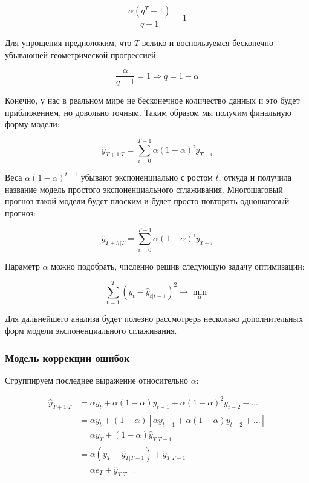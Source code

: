 \documentclass[12pt,fleqn]{article}
\begin{document}
\begin{equation}
\frac{\alpha(q^T - 1)}{q-1} = 1
\end{equation}

Для упрощения предположим, что $T$ велико и воспользуемся бесконечно убывающей геометрической прогрессией:

\begin{equation}
\frac{\alpha}{q-1} = 1 \Rightarrow q = 1-\alpha
\end{equation}

Конечно, у нас в реальном мире не бесконечное количество данных и это будет приближением, но довольно точным. Таким образом мы получим финальную форму модели:

\begin{equation}
\hat{y}_{T+1|T} = \sum_{i=0}^{T-1} \alpha (1-\alpha)^{i} y_{T-i}
\end{equation}

Веса $ \alpha (1-\alpha)^{t-1} $ убывают экспоненциально с ростом $t$, откуда и получила название модель простого экспоненциального сглаживания. Многошаговый прогноз такой модели будет плоским и будет просто повторять одношаговый прогноз:

\begin{equation}
\hat{y}_{T+h|T} = \sum_{i=0}^{T-1} \alpha (1-\alpha)^{i} y_{T-i}
\end{equation}

Параметр $\alpha$ можно подобрать, численно решив следующую задачу оптимизации:

$$
\sum_{t=1}^{T}(y_t - \hat{y}_{t|t-1})^2 \rightarrow \min_\alpha
$$

Для дальнейшего анализа будет полезно рассмотрерь несколько дополнительных форм модели экспоненциального сглаживания.

\subsubsection{Модель коррекции ошибок}

Сгруппируем последнее выражение относительно $\alpha$:

\begin{equation}
	\label{error_correction}
	\begin{split}
		\hat{y}_{T+1|T} 
		&= \alpha y_t + \alpha (1-\alpha) y_{t-1} + \alpha (1-\alpha)^2 y_{t-2} + \ldots \\
		&= \alpha y_t +(1-\alpha)[ \alpha y_{t-1} + \alpha (1-\alpha) y_{t-2} + \ldots ] \\
		&= \alpha y_T +(1-\alpha) \hat{y}_{T|T-1} \\
		&= \alpha (y_T - \hat{y}_{T|T-1}) + \hat{y}_{T|T-1} \\
		&= \alpha e_T + \hat{y}_{T|T-1}
	\end{split}
\end{equation}
\end{document}
